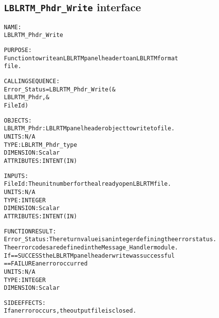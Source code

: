 \subsection{\texttt{LBLRTM\_Phdr\_Write} interface}
  \label{sec:LBLRTM_Phdr_Write_interface}
  \begin{alltt}
 
  NAME:
        LBLRTM_Phdr_Write
 
  PURPOSE:
        Function to write an LBLRTM panel header to an LBLRTM format
        file.
 
  CALLING SEQUENCE:
        Error_Status = LBLRTM_Phdr_Write( &
                         LBLRTM_Phdr, &
                         FileId       )
 
  OBJECTS:
        LBLRTM_Phdr:  LBLRTM panel header object to write to file.
                      UNITS:      N/A
                      TYPE:       LBLRTM_Phdr_type
                      DIMENSION:  Scalar
                      ATTRIBUTES: INTENT(IN)
 
  INPUTS:
        FileId:       The unit number for the already open LBLRTM file.
                      UNITS:      N/A
                      TYPE:       INTEGER
                      DIMENSION:  Scalar
                      ATTRIBUTES: INTENT(IN)
 
  FUNCTION RESULT:
        Error_Status: The return value is an integer defining the error status.
                      The error codes are defined in the Message_Handler module.
                      If == SUCCESS the LBLRTM panel header write was successful
                         == FAILURE an error occurred
                      UNITS:      N/A
                      TYPE:       INTEGER
                      DIMENSION:  Scalar
 
  SIDE EFFECTS:
        If an error occurs, the output file is closed.
 
  \end{alltt}
